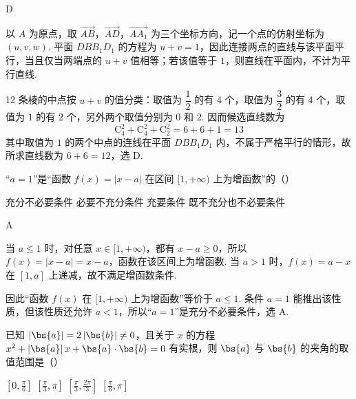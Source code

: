 \begin{answer}
D
\end{answer}

\begin{solution}
以 \(A\) 为原点，取 \(\overrightarrow{AB}\)，\(\overrightarrow{AD}\)，\(\overrightarrow{AA_1}\) 为三个坐标方向，记一个点的仿射坐标为 \((u,v,w)\). 平面 \(DBB_1D_1\) 的方程为 \(u+v=1\)，因此连接两点的直线与该平面平行，当且仅当两端点的 \(u+v\) 值相等；若该值等于 \(1\)，则直线在平面内，不计为平行直线.

12 条棱的中点按 \(u+v\) 的值分类：取值为 \(\dfrac12\) 的有 4 个，取值为 \(\dfrac32\) 的有 4 个，取值为 \(1\) 的有 2 个，另外两个取值分别为 \(0\) 和 \(2\). 因而候选直线数为
\[
\mathrm C_4^2+\mathrm C_4^2+\mathrm C_2^2=6+6+1=13
\]
其中取值为 \(1\) 的两个中点的连线在平面 \(DBB_1D_1\) 内，不属于严格平行的情形，故所求直线数为 \(6+6=12\)，选 D.
\end{solution}

\begin{problem}
“\(a=1\)”是“函数 \( f(x) = |x - a| \) 在区间 \( [1, +\infty) \) 上为增函数”的（\quad）

\choices
    {充分不必要条件}
    {必要不充分条件}
    {充要条件}
    {既不充分也不必要条件}
\end{problem}

\begin{answer}
A
\end{answer}

\begin{solution}
当 \(a\leqslant1\) 时，对任意 \(x\in[1,+\infty)\)，都有 \(x-a\geqslant0\)，所以 \(f(x)=|x-a|=x-a\)，函数在该区间上为增函数. 当 \(a>1\) 时，\(f(x)=a-x\) 在 \([1,a]\) 上递减，故不满足增函数条件.

因此“函数 \(f(x)\) 在 \([1,+\infty)\) 上为增函数”等价于 \(a\leqslant1\). 条件 \(a=1\) 能推出该性质，但该性质还允许 \(a<1\)，所以“\(a=1\)”是充分不必要条件，选 A.
\end{solution}

\begin{problem}
已知 \( \left|\bs{a}\right| = 2\left|\bs{b}\right| \neq 0 \)，且关于 \(x\) 的方程 \(x^{2} + \left|\bs{a}\right|x + \bs{a}\cdot\bs{b} = 0\) 有实根，则 \( \bs{a} \) 与 \( \bs{b} \) 的夹角的取值范围是（\quad）

\choices
    {\(\left[0, \frac{\pi}{6}\right]\)}
    {\(\left[\frac{\pi}{3}, \pi\right]\)}
    {\(\left[\frac{\pi}{3}, \frac{2\pi}{3}\right]\)}
    {\(\left[\frac{\pi}{6}, \pi\right]\)}
\end{problem}

